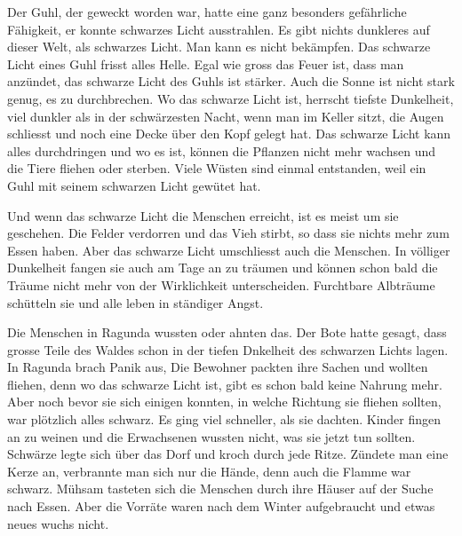 \begin{swb}
Der Guhl, der geweckt worden war, hatte eine ganz besonders gefährliche Fähigkeit, er konnte schwarzes Licht ausstrahlen. Es gibt nichts dunkleres auf dieser Welt, als schwarzes Licht. Man kann es nicht bekämpfen. Das schwarze Licht eines Guhl frisst alles Helle. Egal wie gross das Feuer ist, dass man anzündet, das schwarze Licht des Guhls ist stärker. Auch die Sonne ist nicht stark genug, es zu durchbrechen. Wo das schwarze Licht ist, herrscht tiefste Dunkelheit, viel dunkler als in der schwärzesten Nacht, wenn man im Keller sitzt, die Augen schliesst und noch eine Decke über den Kopf gelegt hat. Das schwarze Licht kann alles durchdringen und wo es ist, können die Pflanzen nicht mehr wachsen und die Tiere fliehen oder sterben. Viele Wüsten sind einmal entstanden, weil ein Guhl mit seinem schwarzen Licht gewütet hat. 

Und wenn das schwarze Licht die Menschen erreicht, ist es meist um sie geschehen. Die Felder verdorren und das Vieh stirbt, so dass sie nichts mehr zum Essen haben. Aber das schwarze Licht umschliesst auch die Menschen. In völliger Dunkelheit fangen sie auch am Tage an zu träumen und können schon bald die Träume nicht mehr von der Wirklichkeit unterscheiden. Furchtbare Albträume schütteln sie und alle leben in ständiger Angst.


Die Menschen in Ragunda wussten oder ahnten das. Der Bote hatte gesagt, dass grosse Teile des Waldes schon in der tiefen Dnkelheit des schwarzen Lichts lagen. In Ragunda brach Panik aus, Die Bewohner packten ihre Sachen und wollten fliehen, denn wo das schwarze Licht ist, gibt es schon bald keine Nahrung mehr. Aber noch bevor sie sich einigen konnten, in welche Richtung sie fliehen sollten, war plötzlich alles schwarz. Es ging viel schneller, als sie dachten. Kinder fingen an zu weinen und die Erwachsenen wussten nicht, was sie jetzt tun sollten. Schwärze legte sich über das Dorf und kroch durch jede Ritze. Zündete man eine Kerze an, verbrannte man sich nur die Hände, denn auch die Flamme war schwarz. Mühsam tasteten sich die Menschen durch ihre Häuser auf der Suche nach Essen. Aber die Vorräte waren nach dem Winter aufgebraucht und etwas neues wuchs nicht.


\end{swb}
